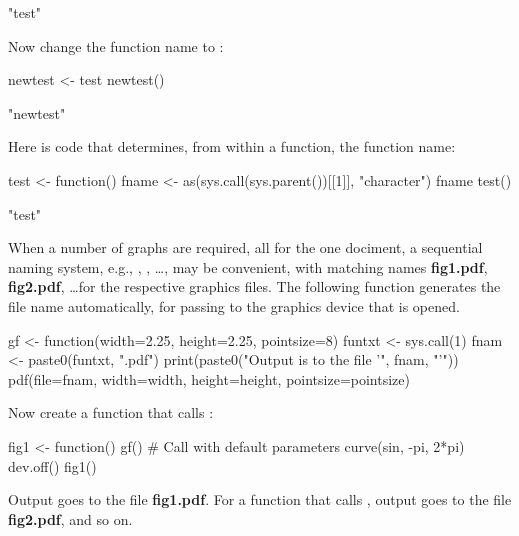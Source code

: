 \begin{Schunk}
\begin{Soutput}
[1] "test"
\end{Soutput}
\end{Schunk}

\begin{marginfigure}
Now change the function name to :
\begin{Schunk}
\begin{Sinput}
newtest <- test
newtest()
\end{Sinput}
\begin{Soutput}
[1] "newtest"
\end{Soutput}
\end{Schunk}
\end{marginfigure}
Here is code that determines, from within a function,
the function name:
\begin{Schunk}
\begin{Sinput}
test <- function(){
 fname <- as(sys.call(sys.parent())[[1]],
             "character")
  fname
}
test()
\end{Sinput}
\begin{Soutput}
[1] "test"
\end{Soutput}
\end{Schunk}

When a number of graphs are required, all for the one dociment, a
sequential naming system, e.g., , , \ldots,
may be convenient, with matching names \textbf{fig1.pdf},
\textbf{fig2.pdf}, \ldots for the respective graphics files.  The
following function  generates the file name automatically,
for passing to the graphics device that is opened.
\begin{Schunk}
\begin{Sinput}
gf <-
    function(width=2.25, height=2.25, pointsize=8){
        funtxt <- sys.call(1)
        fnam <- paste0(funtxt, ".pdf")
        print(paste0("Output is to the file '",
                     fnam, "'"))
        pdf(file=fnam, width=width, height=height,
            pointsize=pointsize)
    }
\end{Sinput}
\end{Schunk}

Now create a function that calls :
\begin{Schunk}
\begin{Sinput}
fig1 <- function(){
    gf()             # Call with default parameters
    curve(sin, -pi, 2*pi)
    dev.off()
}
fig1()
\end{Sinput}
\end{Schunk}
\noindent
Output goes to the file \textbf{fig1.pdf}.  For a function
 that calls , output goes to the file
\textbf{fig2.pdf}, and so on.

